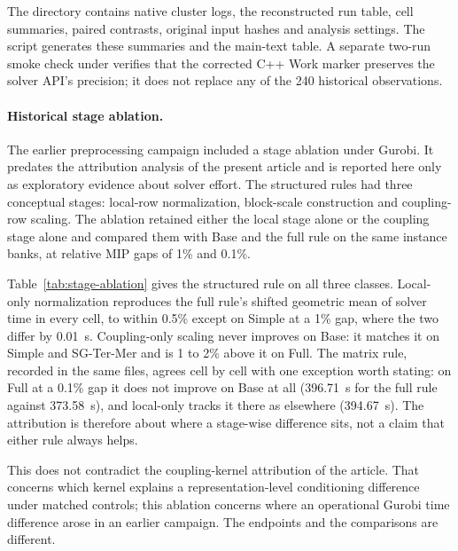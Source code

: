 \documentclass[11pt]{article}
\begin{document}
The directory  contains native
cluster logs, the reconstructed run table, cell summaries, paired contrasts, original
input hashes and analysis settings. The script
 generates these summaries and the
main-text table. A separate two-run smoke check under 
verifies that the corrected C++ Work marker preserves the solver API's precision;
it does not replace any of the 240 historical observations.

\paragraph{Historical stage ablation.}
The earlier preprocessing campaign included a stage ablation under Gurobi. It predates the
attribution analysis of the present article and is reported here only as exploratory evidence
about solver effort. The structured rules had three conceptual stages: local-row normalization,
block-scale construction and coupling-row scaling. The ablation retained either the local stage
alone or the coupling stage alone and compared them with Base and the full rule on the same
instance banks, at relative MIP gaps of 1\% and 0.1\%.

Table~\ref{tab:stage-ablation} gives the structured rule on all three classes. Local-only
normalization reproduces the full rule's shifted geometric mean of solver time in every cell,
to within 0.5\% except on Simple at a 1\% gap, where the two differ by 0.01~s. Coupling-only
scaling never improves on Base: it matches it on Simple and SG-Ter-Mer and is 1 to 2\% above it
on Full. The matrix rule, recorded in the same files, agrees cell by cell with one exception
worth stating: on Full at a 0.1\% gap it does not improve on Base at all (396.71~s for the full
rule against 373.58~s), and local-only tracks it there as elsewhere (394.67~s). The attribution
is therefore about where a stage-wise difference sits, not a claim that either rule always helps.

This does not contradict the coupling-kernel attribution of the article. That concerns which
kernel explains a representation-level conditioning difference under matched controls; this
ablation concerns where an operational Gurobi time difference arose in an earlier campaign. The
endpoints and the comparisons are different.

\begin{table}[htb]
\centering\small
\caption{Historical stage ablation, structured rule. Shifted geometric mean of solver time in
seconds, Gurobi. The ablation belongs to the earlier preprocessing campaign and is not a rerun
of the present policy set; \texttt{make research-stage-ablation} recomputes it from the stored
runs in \texttt{results-revision/r5-ablation/}.}
\label{tab:stage-ablation}

\end{table}
\end{document}
